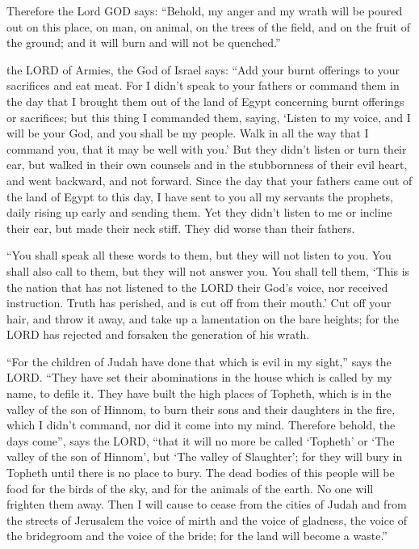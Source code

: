  Therefore the Lord GOD says: ``Behold, my anger and my
wrath will be poured out on this place, on man, on animal, on the trees
of the field, and on the fruit of the ground; and it will burn and will
not be quenched.''

 the LORD of Armies, the God of Israel says: ``Add your
burnt offerings to your sacrifices and eat meat.  For I
didn't speak to your fathers or command them in the day that I brought
them out of the land of Egypt concerning burnt offerings or sacrifices;
 but this thing I commanded them, saying, `Listen to my
voice, and I will be your God, and you shall be my people. Walk in all
the way that I command you, that it may be well with you.'
 But they didn't listen or turn their ear, but walked in
their own counsels and in the stubbornness of their evil heart, and went
backward, and not forward.  Since the day that your
fathers came out of the land of Egypt to this day, I have sent to you
all my servants the prophets, daily rising up early and sending them.
 Yet they didn't listen to me or incline their ear, but
made their neck stiff. They did worse than their fathers.

 ``You shall speak all these words to them, but they will
not listen to you. You shall also call to them, but they will not answer
you.  You shall tell them, `This is the nation that has
not listened to the LORD their God's voice, nor received instruction.
Truth has perished, and is cut off from their mouth.' 
Cut off your hair, and throw it away, and take up a lamentation on the
bare heights; for the LORD has rejected and forsaken the generation of
his wrath.

 ``For the children of Judah have done that which is evil
in my sight,'' says the LORD. ``They have set their abominations in the
house which is called by my name, to defile it.  They
have built the high places of Topheth, which is in the valley of the son
of Hinnom, to burn their sons and their daughters in the fire, which I
didn't command, nor did it come into my mind.  Therefore
behold, the days come'', says the LORD, ``that it will no more be called
`Topheth' or `The valley of the son of Hinnom', but `The valley of
Slaughter'; for they will bury in Topheth until there is no place to
bury.  The dead bodies of this people will be food for
the birds of the sky, and for the animals of the earth. No one will
frighten them away.  Then I will cause to cease from the
cities of Judah and from the streets of Jerusalem the voice of mirth and
the voice of gladness, the voice of the bridegroom and the voice of the
bride; for the land will become a waste.''

